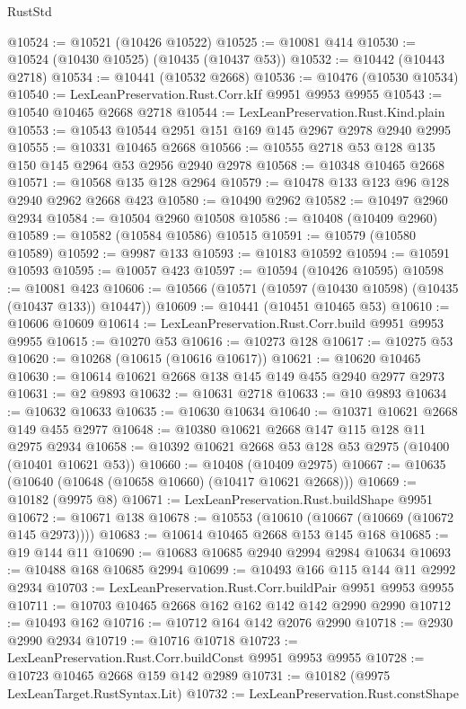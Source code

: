\begin{lexlean}{RustStd}
\begin{coremodule}
@10524 := @10521 (@10426 @10522)
@10525 := @10081 @414
@10530 := @10524 (@10430 @10525) (@10435 (@10437 @53))
@10532 := @10442 (@10443 @2718)
@10534 := @10441 (@10532 @2668)
@10536 := @10476 (@10530 @10534)
@10540 := LexLeanPreservation.Rust.Corr.kIf @9951 @9953 @9955
@10543 := @10540 @10465 @2668 @2718
@10544 := LexLeanPreservation.Rust.Kind.plain
@10553 := @10543 @10544 @2951 @151 @169 @145 @2967 @2978 @2940 @2995
@10555 := @10331 @10465 @2668
@10566 := @10555 @2718 @53 @128 @135 @150 @145 @2964 @53 @2956 @2940 @2978
@10568 := @10348 @10465 @2668
@10571 := @10568 @135 @128 @2964
@10579 := @10478 @133 @123 @96 @128 @2940 @2962 @2668 @423
@10580 := @10490 @2962
@10582 := @10497 @2960 @2934
@10584 := @10504 @2960 @10508
@10586 := @10408 (@10409 @2960)
@10589 := @10582 (@10584 @10586) @10515
@10591 := @10579 (@10580 @10589)
@10592 := @9987 @133
@10593 := @10183 @10592
@10594 := @10591 @10593
@10595 := @10057 @423
@10597 := @10594 (@10426 @10595)
@10598 := @10081 @423
@10606 := @10566 (@10571 (@10597 (@10430 @10598) (@10435 (@10437 @133)) @10447))
@10609 := @10441 (@10451 @10465 @53)
@10610 := @10606 @10609
@10614 := LexLeanPreservation.Rust.Corr.build @9951 @9953 @9955
@10615 := @10270 @53
@10616 := @10273 @128
@10617 := @10275 @53
@10620 := @10268 (@10615 (@10616 @10617))
@10621 := @10620 @10465
@10630 := @10614 @10621 @2668 @138 @145 @149 @455 @2940 @2977 @2973
@10631 := @2 @9893
@10632 := @10631 @2718
@10633 := @10 @9893
@10634 := @10632 @10633
@10635 := @10630 @10634
@10640 := @10371 @10621 @2668 @149 @455 @2977
@10648 := @10380 @10621 @2668 @147 @115 @128 @11 @2975 @2934
@10658 := @10392 @10621 @2668 @53 @128 @53 @2975 (@10400 (@10401 @10621 @53))
@10660 := @10408 (@10409 @2975)
@10667 := @10635 (@10640 (@10648 (@10658 @10660) (@10417 @10621 @2668)))
@10669 := @10182 (@9975 @8)
@10671 := LexLeanPreservation.Rust.buildShape @9951
@10672 := @10671 @138
@10678 := @10553 (@10610 (@10667 (@10669 (@10672 @145 @2973))))
@10683 := @10614 @10465 @2668 @153 @145 @168
@10685 := @19 @144 @11
@10690 := @10683 @10685 @2940 @2994 @2984 @10634
@10693 := @10488 @168 @10685 @2994
@10699 := @10493 @166 @115 @144 @11 @2992 @2934
@10703 := LexLeanPreservation.Rust.Corr.buildPair @9951 @9953 @9955
@10711 := @10703 @10465 @2668 @162 @162 @142 @142 @2990 @2990
@10712 := @10493 @162
@10716 := @10712 @164 @142 @2076 @2990
@10718 := @2930 @2990 @2934
@10719 := @10716 @10718
@10723 := LexLeanPreservation.Rust.Corr.buildConst @9951 @9953 @9955
@10728 := @10723 @10465 @2668 @159 @142 @2989
@10731 := @10182 (@9975 LexLeanTarget.RustSyntax.Lit)
@10732 := LexLeanPreservation.Rust.constShape

\end{coremodule}
\end{lexlean}
